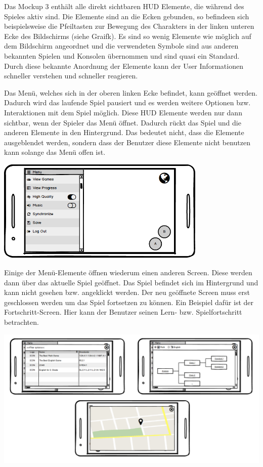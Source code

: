 			Das Mockup 3 enthält alle direkt sichtbaren HUD Elemente, die während des Spieles aktiv sind. Die Elemente sind an die Ecken gebunden, so befindeen sich beispielsweise die Pfeiltasten zur Bewegung des Charakters in der linken unteren Ecke des Bildschirms (siehe Graifk). Es sind so wenig Elemente wie möglich auf dem Bildschirm angeordnet und die verwendeten Symbole sind aus anderen bekannten Spielen und Konsolen übernommen und sind quasi ein Standard. Durch diese bekannte Anordnung der Elemente kann der User Informationen schneller verstehen und schneller reagieren. %
			
			Das Menü, welches sich in der oberen linken Ecke befindet, kann geöffnet werden. Dadurch wird das laufende Spiel pausiert und es werden weitere Optionen bzw. Interaktionen mit dem Spiel möglich. Diese HUD Elemente werden nur dann sichtbar, wenn der Spieler das Menü öffnet. Dadurch rückt das Spiel und die anderen Elemente in den Hintergrund. Das bedeutet nicht, dass die Elemente ausgeblendet werden, sondern dass der Benutzer diese Elemente nicht benutzen kann solange das Menü offen ist.
			
			\begin{center}
				\includegraphics[width=10cm]{pics/Menu.png}
			\end{center}
			
			Einige der Menü-Elemente öffnen wiederum einen anderen Screen. Diese werden dann über das aktuelle Spiel geöffnet. Das Spiel befindet sich im Hintergrund und kann nicht gesehen bzw. angeklickt werden. Der neu geöffnete Screen muss erst geschlossen werden um das Spiel fortsetzen zu können. Ein Beispiel dafür ist der Fortschritt-Screen. Hier kann der Benutzer seinen Lern- bzw. Spielfortschritt betrachten.
			
			\begin{center}
				\includegraphics[width=\textwidth]{pics/NewWindows.png}
			\end{center}
			
